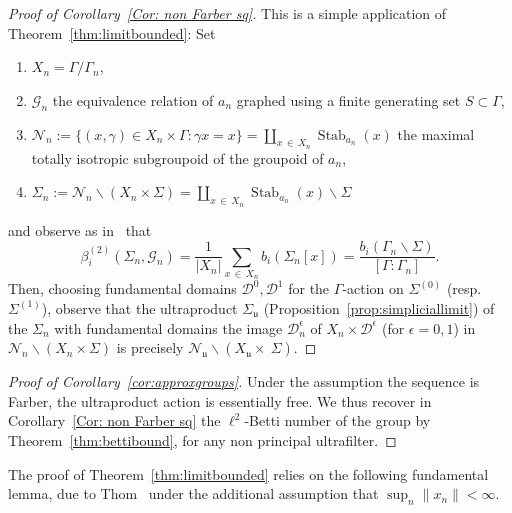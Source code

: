 \documentclass[AHL,Unicode,longabstracts,published]{cedram}
\newcommand{\cn}{\mathcal{N}}
\newcommand{\cg}{\mathcal{G}}
\newcommand{\cd}{\mathcal{D}}
\DeclareMathOperator{\Stab}{Stab}
\newcommand{\ul}{\mathfrak{u}}
\newcommand*{\alphenumi}{\renewcommand*{\theenumi}{\alph{enumi}}}
\begin{document}
\begin{proof}[Proof of Corollary~\ref{Cor: non Farber sq}]
This is a simple application of Theorem~\ref{thm:limitbounded}: Set
\begin{enumerate}\alphenumi
\item $X_n=\Gamma/\Gamma_n$,
\item $\cg_n$ the equivalence relation of $a_n$ graphed using a finite generating set $S\subset \Gamma$,
\item $\cn_n:=\{(x,\gamma)\in X_{n}\times \Gamma: \gamma x=x\} =\coprod_{x\,\in\,X_n} \Stab_{a_n}(x) $ the maximal totally isotropic subgroupoid of the groupoid of $a_n$,
\item $\Sigma_n:= \cn_n\backslash\left(X_n\times \Sigma\right)=\coprod_{x\,\in\,X_n} \Stab_{a_n}(x)\backslash \Sigma$
\end{enumerate}
and observe as in~\cite[Proposition~2.3]{berggab} that
\[
\beta^{(2)}_i(\Sigma_n,\cg_n)=\frac{1}{|X_n|}\sum_{x\,\in\,X_n} b_i(\Sigma_n[x])=\frac{b_i(\Gamma_n\backslash \Sigma)}{[\Gamma:\Gamma_n]}.
\]
Then, choosing fundamental domains $\cd^{0}, \cd^{1}$ for the $\Gamma$-action on $\Sigma^{(0)}$ (resp. $\Sigma^{(1)}$), observe that the ultraproduct $\Sigma_\ul$ (Proposition~\ref{prop:simpliciallimit}) of the $\Sigma_n$ with fundamental domains the image $\cd^{\epsilon}_n$ of $X_n\times \cd^{\epsilon}$ (for $\epsilon=0,1$) in $\cn_n\backslash\left(X_n\times \Sigma\right)$ is precisely $\cn_\ul \backslash (X_{\ul}\times~\Sigma)$.
\end{proof}


\begin{proof}[Proof of Corollary~\ref{cor:approxgroups}]
Under the assumption the sequence is Farber, the ultraproduct action is essentially free. We thus recover in Corollary~\ref{Cor: non Farber sq} the $\ell^2$-Betti number of the group by Theorem~\ref{thm:bettibound}, for any non principal ultrafilter.
\end{proof}

The proof of Theorem~\ref{thm:limitbounded} relies on the following fundamental lemma, due to Thom~\cite{thom08} under the additional assumption that $\sup_n \|x_n\|<\infty$.
\end{document}
